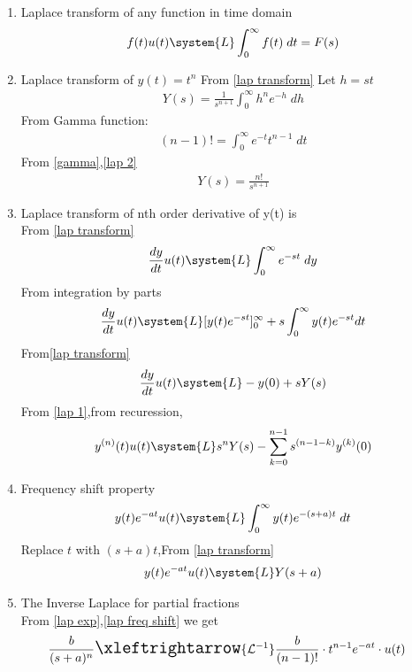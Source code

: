 \begin{enumerate}[label=\thechapter.\arabic*,ref=\thechapter.\theenumi]
\item Laplace transform of any function in time domain
\begin{align}
        f(t)u(t)\system{L}\int_{0}^{\infty}f(t)\; dt=F(s)\label{lap transform}
\end{align}
\item Laplace transform of $y(t)=t^n$
From \eqref{lap transform}
Let $h=st$
\begin{align}
    Y(s)=\frac{1}{s^{n+1}}\int_{0}^{\infty}h^ne^{-h}\;dh\label{lap 2}
\end{align}
From Gamma function:
\begin{align}
        (n-1)!=\int_0^\infty e^{-t}t^{n-1}\;dt\label{gamma}
\end{align}
From \eqref{gamma},\eqref{lap 2}
\begin{align}
    Y(s)=\frac{n!}{s^{n+1}}\label{lap exp}
\end{align}
\item Laplace transform of nth order derivative of y(t) is\\
From \eqref{lap transform}
\begin{align}
        \frac{dy}{dt}u(t)\system{L}\int_{0}^\infty e^{-st}\; dy\\
\end{align}
From integration by parts
\begin{align}
    \frac{dy}{dt}u(t)\system{L}[y(t)e^{-st}]_0^\infty+s\int_0^\infty y(t)e^{-st}dt\\
\end{align}
From\eqref{lap transform}
\begin{align}
    \frac{dy}{dt}u(t)\system{L}-y(0)+sY(s)\label{lap 1}\\
\end{align}
From \eqref{lap 1},from recuression,
\begin{align}
    y^{(n)}(t)u(t)\system{L}s^nY(s)-\sum\limits_{k=0}^{n-1}s^{(n-1-k)}y^{(k)}(0)\label{lap (derivatives)}
\end{align}
\item Frequency shift property
\begin{align}
  y(t)e^{-at}u(t)\system{L}\int_0^{\infty}y(t)e^{-(s+a)t}\;dt
\end{align}
Replace $t$ with $(s+a)t$,From \eqref{lap transform}
\begin{align}
  y(t)e^{-at}u(t)\system{L}Y(s+a)\label{lap freq shift}
\end{align}
\item The Inverse Laplace for partial fractions\\
From \eqref{lap exp},\eqref{lap freq shift} we get
\begin{align}
    &\frac{b}{(s+a)^n}\Large\xleftrightarrow{\mathcal{L}^{-1}}\frac{b}{(n-1)!}\cdot t^{n-1} e^{-at}\cdot u(t)\label{inv lap (partial fractions)}
\end{align}
\end{enumerate}
